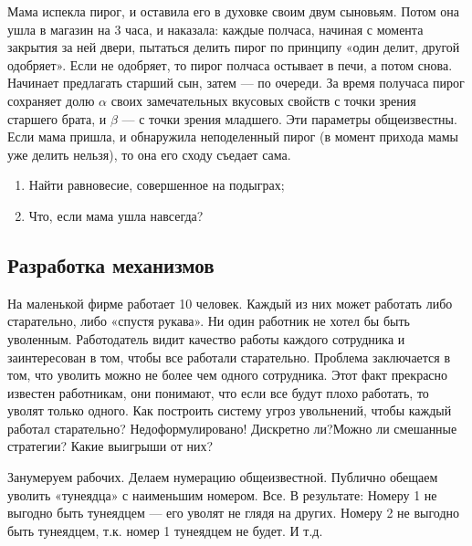 \begin{problem}
\begin{source}
\cite{savva:nmu}
\end{source}
 Мама испекла пирог, и оставила его в духовке своим двум сыновьям. Потом она ушла в магазин на 3 часа, и наказала: каждые полчаса, начиная с момента закрытия за ней двери, пытаться делить пирог по принципу «один делит, другой одобряет». Если не одобряет, то пирог полчаса остывает в печи, а потом снова. Начинает предлагать старший сын, затем — по очереди. За время получаса пирог сохраняет долю $\alpha$ своих замечательных вкусовых свойств с точки зрения старшего брата, и $\beta$ — с точки зрения младшего. Эти параметры общеизвестны. Если мама пришла, и обнаружила неподеленный пирог (в момент прихода мамы уже делить нельзя), то она его сходу съедает сама.
\begin{enumerate}
\item Найти равновесие, совершенное на подыграх;
\item Что, если мама ушла навсегда?
\end{enumerate}






\begin{sol}

\end{sol}
\end{problem}


\subsection{Разработка механизмов}

\begin{problem}\par
\begin{source} \cite[p.60]{miller:gtw} \end{source}
На маленькой фирме работает 10 человек. Каждый из них может работать либо старательно, либо «спустя рукава». Ни один работник не хотел бы быть уволенным. Работодатель видит качество работы каждого сотрудника и заинтересован в том, чтобы все работали старательно. Проблема заключается в том, что уволить можно не более чем одного сотрудника. Этот факт прекрасно известен работникам, они понимают, что если все будут плохо работать, то уволят только одного. Как построить систему угроз увольнений, чтобы каждый работал старательно?
{\red Недоформулировано! Дискретно ли?Можно ли смешанные стратегии? Какие выигрыши от них?}
\par




\begin{sol}
Занумеруем рабочих. Делаем нумерацию общеизвестной. Публично обещаем уволить «тунеядца» с наименьшим номером. Все. В результате: Номеру 1 не выгодно быть тунеядцем — его уволят не глядя на других. Номеру 2 не выгодно быть тунеядцем, т.к. номер 1 тунеядцем не будет. И т.д.
\end{sol}
\end{problem}



